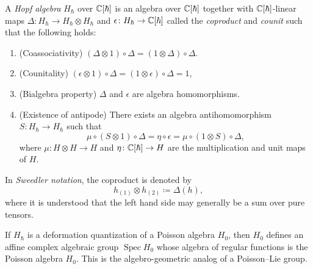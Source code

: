 \begin{definition}
	A \emph{Hopf algebra} $H_\hbar$ over $\mathbb{C}[\hbar]$ is an algebra over $\mathbb{C}[\hbar]$ together with $\mathbb{C}[\hbar]$-linear maps $\Delta\colon H_\hbar \to H_\hbar \otimes H_\hbar$ and $\epsilon\colon H_\hbar \to \mathbb{C}[\hbar]$ called the \emph{coproduct} and \emph{counit} such that the following holds:
	\begin{enumerate}[label=(\roman*)]
		\item (Coassociativity) $(\Delta \otimes 1) \circ \Delta = (1 \otimes \Delta) \circ \Delta$.
		\item (Counitality) $(\epsilon \otimes 1) \circ \Delta = (1 \otimes \epsilon) \circ \Delta = 1$,
		\item (Bialgebra property) $\Delta$ and $\epsilon$ are algebra homomorphisms.
		\item (Existence of antipode) There exists an algebra antihomomorphism $S \colon H_\hbar \to H_\hbar$ such that
		\begin{equation}
			\mu \circ (S \otimes 1) \circ \Delta = \eta \circ \epsilon = \mu \circ (1 \otimes S) \circ \Delta,
		\end{equation}
		where $\mu\colon H \otimes H \to H$ and $\eta\colon \mathbb{C}[\hbar] \to H$ are the multiplication and unit maps of $H$.
	\end{enumerate}
	In \emph{Sweedler notation}, the coproduct is denoted by
	\begin{equation}
		h_{(1)} \otimes h_{(2)} \coloneq \Delta(h),
	\end{equation}
	where it is understood that the left hand side may generally be a sum over pure tensors.
\end{definition}

\begin{remark}
	If $H_\hbar$ is a deformation quantization of a Poisson algebra $H_0$, then $H_0$ defines an affine complex algebraic group $\operatorname{Spec} H_0$ whose algebra of regular functions is the Poisson algebra $H_0$. This is the algebro-geometric analog of a Poisson--Lie group.
\end{remark}

